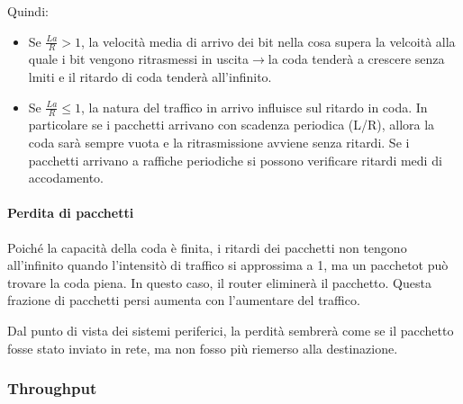 \documentclass{book}
\newenvironment{itemizeminus}{\begin{itemize} \renewcommand{\labelitemi}{$-$}\renewcommand{\labelitemii}{$-$}\renewcommand{\labelitemiii}{$-$}\renewcommand{\labelitemiv}{$-$}}{\end{itemize}}
{\theorembodyfont{\rmfamily}\newtheorem{example}{Example}}
\begin{document}
Quindi:
\begin{itemizeminus}
  \item Se $\frac{La}{R} > 1$, la velocit{\`a} media di arrivo dei bit nella
  cosa supera la velcoit{\`a} alla quale i bit vengono ritrasmessi in
  uscita$\rightarrow$la coda tender{\`a} a crescere senza lmiti e il ritardo
  di coda tender{\`a} all'infinito.
  
  \item Se $\frac{La}{R} \leqslant 1$, la natura del traffico in arrivo
  influisce sul ritardo in coda. In particolare se i pacchetti arrivano con
  scadenza periodica (L/R), allora la coda sar{\`a} sempre vuota e la
  ritrasmissione avviene senza ritardi. Se i pacchetti arrivano a raffiche
  periodiche si possono verificare ritardi medi di accodamento.
\end{itemizeminus}
{}

\paragraph{Perdita di pacchetti}

Poich{\'e} la capacit{\`a} della coda {\`e} finita, i ritardi dei pacchetti
non tengono all'infinito quando l'intensit{\`o} di traffico si approssima a 1,
ma un pacchetot pu{\`o} trovare la coda piena. In questo caso, il router
eliminer{\`a} il pacchetto. Questa frazione di pacchetti persi aumenta con
l'aumentare del traffico.

Dal punto di vista dei sistemi periferici, la perdit{\`a} sembrer{\`a} come se
il pacchetto fosse stato inviato in rete, ma non fosso pi{\`u} riemerso alla
destinazione.

\subsubsection{Throughput}
\end{document}
